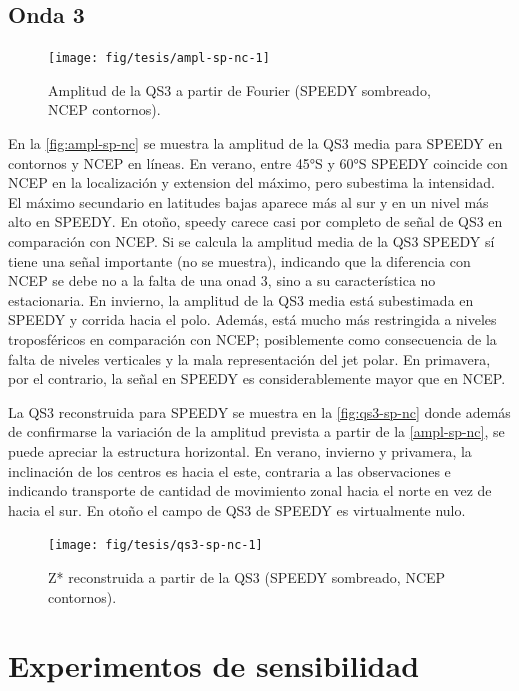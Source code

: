 \documentclass[spanish,a4paper,12pt,oneside]{book}
\begin{document}
\subsection{Onda 3}\label{onda-3-1}

\begin{figure}
\texttt{[image: fig/tesis/ampl-sp-nc-1]} \caption{Amplitud de la QS3 a partir de Fourier (SPEEDY sombreado, NCEP contornos).}\label{fig:ampl-sp-nc}
\end{figure}

En la \autoref{fig:ampl-sp-nc} se muestra la amplitud de la QS3 media
para SPEEDY en contornos y NCEP en líneas. En verano, entre 45°S y 60°S
SPEEDY coincide con NCEP en la localización y extension del máximo, pero
subestima la intensidad. El máximo secundario en latitudes bajas aparece
más al sur y en un nivel más alto en SPEEDY. En otoño, speedy carece
casi por completo de señal de QS3 en comparación con NCEP. Si se calcula
la amplitud media de la QS3 SPEEDY sí tiene una señal importante (no se
muestra), indicando que la diferencia con NCEP se debe no a la falta de
una onad 3, sino a su característica no estacionaria. En invierno, la
amplitud de la QS3 media está subestimada en SPEEDY y corrida hacia el
polo. Además, está mucho más restringida a niveles troposféricos en
comparación con NCEP; posiblemente como consecuencia de la falta de
niveles verticales y la mala representación del jet polar. En primavera,
por el contrario, la señal en SPEEDY es considerablemente mayor que en
NCEP.

La QS3 reconstruida para SPEEDY se muestra en la \autoref{fig:qs3-sp-nc}
donde además de confirmarse la variación de la amplitud prevista a
partir de la \autoref{ampl-sp-nc}, se puede apreciar la estructura
horizontal. En verano, invierno y privamera, la inclinación de los
centros es hacia el este, contraria a las observaciones e indicando
transporte de cantidad de movimiento zonal hacia el norte en vez de
hacia el sur. En otoño el campo de QS3 de SPEEDY es virtualmente nulo.

\begin{figure}
\texttt{[image: fig/tesis/qs3-sp-nc-1]} \caption{Z* reconstruida a partir de la QS3 (SPEEDY sombreado, NCEP contornos).}\label{fig:qs3-sp-nc}
\end{figure}

\section{Experimentos de
sensibilidad}\label{experimentos-de-sensibilidad}
\end{document}
